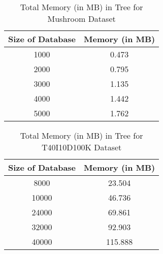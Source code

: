 %            
%            
%            
%        
		\begin{table}[h]
        \centering
        \begin{tabular}{|c|c|}
        \hline 
       Size of Database        &    Memory (in MB)\\    \hline\hline
        
				1000&0.473\\\hline
				2000&0.795\\\hline
				3000&1.135\\\hline
				4000&1.442\\\hline
				5000&1.762\\\hline
		
            \end{tabular}
        \caption{ Total Memory (in MB) in Tree for Mushroom Dataset}
        \label{result:g_m_const_tran_mem}
        \end{table}
		
		\begin{table}[h]
        \centering
        \begin{tabular}{|c|c|}
        \hline 
       \textbf{Size of Database}        &    \textbf{Memory (in MB)}\\    \hline\hline
        
				8000 &23.504\\\hline
				10000&46.736\\\hline
				24000&69.861\\\hline
				32000&92.903\\\hline
				40000&115.888\\\hline
		
            \end{tabular}
        \caption{ Total Memory (in MB) in Tree for T40I10D100K Dataset}
        \label{result:g_t10_const_tran_mem}
        \end{table}

